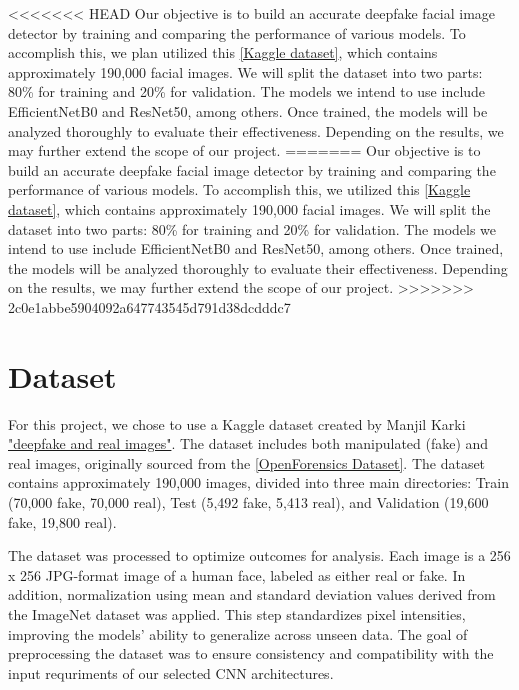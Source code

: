 \documentclass[conference]{IEEEtran}
\begin{document}
<<<<<<< HEAD
Our objective is to build an accurate deepfake facial image detector by training and comparing the performance of various models. To accomplish this, we plan utilized this \href{https://www.kaggle.com/datasets/manjilkarki/deepfake-and-real-images}{[Kaggle dataset]}, which contains approximately 190,000 facial images. We will split the dataset into two parts: 80\% for training and 20\% for validation. The models we intend to use include EfficientNetB0 and ResNet50, among others. Once trained, the models will be analyzed thoroughly to evaluate their effectiveness. Depending on the results, we may further extend the scope of our project.
=======
Our objective is to build an accurate deepfake facial image detector by training and comparing the performance of various models. To accomplish this, we utilized this \href{https://www.kaggle.com/datasets/manjilkarki/deepfake-and-real-images}{[Kaggle dataset]}, which contains approximately 190,000 facial images. We will split the dataset into two parts: 80\% for training and 20\% for validation. The models we intend to use include EfficientNetB0 and ResNet50, among others. Once trained, the models will be analyzed thoroughly to evaluate their effectiveness. Depending on the results, we may further extend the scope of our project.
>>>>>>> 2c0e1abbe5904092a647743545d791d38dcdddc7

\section*{Dataset}
For this project, we chose to use a Kaggle dataset created by Manjil Karki \href{https://www.kaggle.com/datasets/manjilkarki/deepfake-and-real-images}{"deepfake and real images"}. The dataset includes both manipulated (fake) and real images, originally sourced from the \href{https://sites.google.com/view/ltnghia/research/openforensics}{[OpenForensics Dataset]}. The dataset contains approximately 190,000 images, divided into three main directories: Train (70,000 fake, 70,000 real), Test (5,492 fake, 5,413 real), and Validation (19,600 fake, 19,800 real).

The dataset was processed to optimize outcomes for analysis. Each image is a 256 x 256 JPG-format image of a human face, labeled as either real or fake. In addition,  normalization using mean and standard deviation values derived from the ImageNet dataset was applied. This step standardizes pixel intensities, improving the models' ability to generalize across unseen data. The goal of preprocessing the dataset was to ensure consistency and compatibility with the input requriments of our selected CNN architectures.
\end{document}
